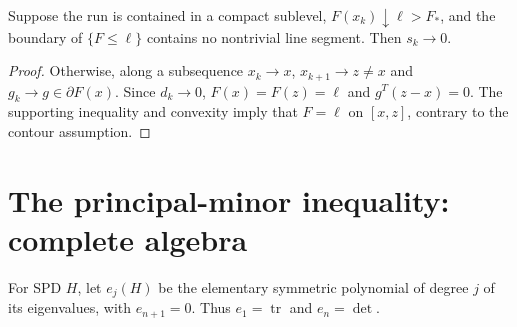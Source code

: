 \begin{lemma}\label{M:strictcontours}
Suppose the run is contained in a compact sublevel, $F(x_k)\downarrow\ell>F_*$, and the boundary of $\{F\le\ell\}$ contains no nontrivial line segment. Then $s_k\to0$.
\end{lemma}
\begin{proof}
Otherwise, along a subsequence $x_k\to x$, $x_{k+1}\to z\ne x$ and $g_k\to g\in\partial F(x)$. Since $d_k\to0$, $F(x)=F(z)=\ell$ and $g^T(z-x)=0$. The supporting inequality and convexity imply that $F=\ell$ on $[x,z]$, contrary to the contour assumption.
\end{proof}

\section{The principal-minor inequality: complete algebra}
\label{M:principal}
For SPD $H$, let $e_j(H)$ be the elementary symmetric polynomial of degree $j$ of its eigenvalues, with $e_{n+1}=0$. Thus $e_1=\operatorname{tr}$ and $e_n=\det$.

